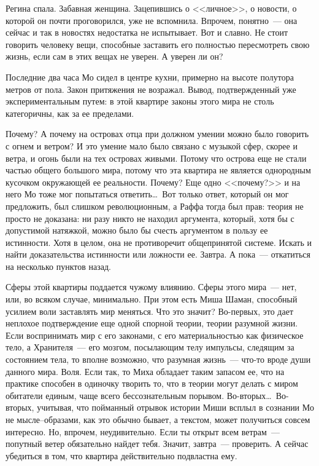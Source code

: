 Регина спала. Забавная женщина. Зацепившись о <<личное>>, о новости, о которой 
он почти проговорился, уже не вспомнила. Впрочем, понятно~--- она сейчас и так в 
новостях недостатка не испытывает. Вот и славно. Не стоит говорить человеку 
вещи, способные заставить его полностью пересмотреть свою жизнь, если сам в 
этих вещах не уверен. А уверен ли он?

Последние два часа Мо сидел в центре кухни, примерно на высоте полутора метров 
от пола. Закон притяжения не возражал. Вывод, подтвержденный уже 
экспериментальным путем: в этой квартире законы этого мира не столь 
категоричны, как за ее пределами.

Почему? А почему на островах отца при должном умении можно было говорить с 
огнем и ветром? И это умение мало было связано с музыкой сфер, скорее и ветра, и 
огонь были на тех островах живыми. Потому что острова еще не стали частью общего 
большого мира, потому что эта квартира не является однородным кусочком 
окружающей ее реальности. Почему? Еще одно <<почему?>> и на него Мо тоже мог 
попытаться ответить\ldots\ Вот только ответ, который он мог предложить, был слишком 
революционным, а Раффа тогда был прав: теория не просто не доказана: ни разу 
никто не находил аргумента, который, хотя бы с допустимой натяжкой, можно было 
бы счесть аргументом в пользу ее истинности. Хотя в целом, она не противоречит 
общепринятой системе. Искать и найти доказательства истинности или ложности ее. 
Завтра. А пока~--- откатиться на несколько пунктов назад.

Сферы этой квартиры поддается чужому влиянию. Сферы этого мира~--- нет, или, во 
всяком случае, минимально. При этом есть Миша Шаман, способный усилием воли 
заставлять мир меняться. Что это значит? Во-первых, это дает неплохое 
подтверждение еще одной спорной теории, теории разумной жизни. Если 
воспринимать мир с его законами, с его материальностью как физическое тело, а Хранителя~--- 
его мозгом, посылающим телу импульсы, следящим за состоянием тела, то вполне 
возможно, что разумная жизнь~--- что-то вроде души данного мира. Воля. Если 
так, то Миха обладает таким запасом ее, что на практике способен в одиночку творить 
то, что в теории могут делать с миром обитатели единым, чаще всего 
бессознательным порывом. Во-вторых\ldots\ Во-вторых, учитывая, что пойманный 
отрывок истории Миши всплыл в сознании Мо не мысле--образами, как это обычно бывает, а 
текстом, может получиться совсем интересно. Но, впрочем, неудивительно. Если ты 
открыт всем ветрам~--- попутный ветер обязательно найдет тебя. Значит, 
завтра~--- проверить. А сейчас убедиться в том, что квартира действительно подвластна ему.

